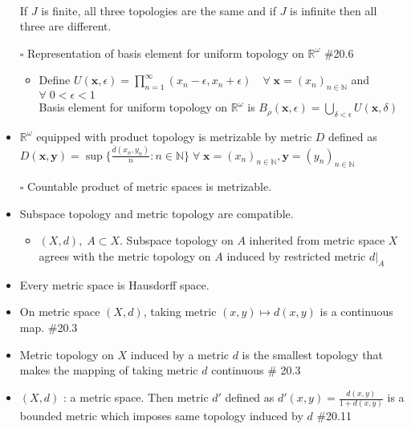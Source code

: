 \documentclass[12pt]{article}
\newcommand{\sq}{$\square$}
\newcommand{\Nat}{\mathbb{N}}
\newcommand{\Real}{\mathbb{R}}
\begin{document}
\begin{itemize}
	\\ If $J$ is finite, all three topologies are the same and if $J$ is infinite then all three are different.
	\item[\sq] Representation of basis element for uniform topology on $\Real^\omega$  \quad \#20.6
	\begin{itemize}
		\item Define $U(\textbf{x}, \epsilon)=\prod_{n=1}^\infty (x_n-\epsilon, x_n+\epsilon) \quad \forall \; \textbf{x}=(x_n)_{n\in \Nat}$ and $\forall \; 0<\epsilon <1$
		\\ Basis element for uniform topology on $\Real^\omega$ is $B_{\overline{\rho}}(\textbf{x}, \epsilon)= \bigcup_{\delta<\epsilon} U(\textbf{x}, \delta)$
	\end{itemize} 
	\item $\Real^\omega$ equipped with product topology is metrizable by metric $D$ defined as \\$D(\textbf{x}, \textbf{y})=\sup\{\frac{\overline{d}(x_n, y_n)}{n} : n\in \Nat \} \; \forall \; \textbf{x}=(x_n)_{n\in \Nat}, \textbf{y}=(y_n)_{n\in \Nat}$
	\item[\sq] Countable product of metric spaces is metrizable.
	\item Subspace topology and metric topology are compatible.
	\begin{itemize}
		\item $(X,d),\; A\subset X$. Subspace topology on $A$ inherited from metric space $X$ agrees with the metric topology on $A$ induced by restricted metric $d|_A$ 
	\end{itemize}
	\item Every metric space is Hausdorff space.
	\item On metric space $(X,d)$, taking metric $(x,y)\mapsto d(x,y)$  is a continuous map. \quad	\#20.3
	\item Metric topology on $X$ induced by a metric $d$ is the smallest topology that makes the mapping of taking metric $d$ continuous \quad \# 20.3
	\item $(X,d)$ : a metric space. Then metric $d'$ defined as $d'(x,y)=\frac{d(x,y)}{1+d(x,y)}$ is a bounded metric which imposes same topology induced by $d$ \quad \#20.11
	
\end{itemize}

\bigskip
\end{document}
